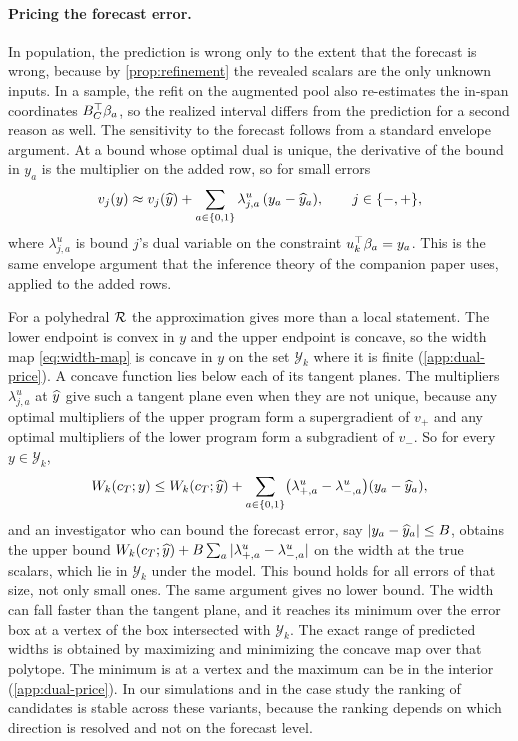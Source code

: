 \paragraph{Pricing the forecast error.}
In population, the prediction is wrong only to the extent that the
forecast is wrong, because by \cref{prop:refinement} the revealed
scalars are the only unknown inputs. In a sample, the refit on the
augmented pool also re-estimates the in-span coordinates
$B_C^\top\beta_a$, so the realized interval differs from the
prediction for a second reason as well. The sensitivity to the forecast
follows from a standard envelope argument. At a bound whose optimal dual
is unique, the derivative of the bound in $y_a$ is the multiplier on the
added row, so for small errors
\begin{equation}
  v_j(y)\approx v_j(\widehat{y})
  +\sum_{a\in\{0,1\}}\lambda^{u}_{j,a}\,(y_a-\widehat{y}_a),
  \qquad j\in\{-,+\},
  \label{eq:dual-pricing}
\end{equation}
where $\lambda^{u}_{j,a}$ is bound $j$'s dual variable on the constraint
$u_{k}^\top\beta_a=y_a$. This is the same envelope argument that
the inference theory of the companion paper uses, applied to the added
rows.

For a polyhedral $\mathcal R$ the approximation gives more than a local
statement. The lower endpoint is convex in $y$ and the upper endpoint is
concave, so the width map \eqref{eq:width-map} is concave in $y$ on the
set $\mathcal Y_k$ where it is finite (\cref{app:dual-price}). A concave
function lies below each of its tangent planes. The multipliers
$\lambda^{u}_{j,a}$ at $\widehat{y}$ give such a tangent plane even when
they are not unique, because any optimal multipliers of the upper
program form a supergradient of $v_+$ and any optimal multipliers of the
lower program form a subgradient of $v_-$. So for every
$y\in\mathcal Y_k$,
\begin{equation}
  W_k(c_T;y)\leq W_k(c_T;\widehat{y})
  +\sum_{a\in\{0,1\}}\bigl(\lambda^{u}_{+,a}-\lambda^{u}_{-,a}\bigr)
  (y_a-\widehat{y}_a),
  \label{eq:width-upper}
\end{equation}
and an investigator who can bound the forecast error, say
$|y_a-\widehat{y}_a|\leq B$, obtains the upper bound
$W_k(c_T;\widehat{y})+B\sum_a|\lambda^{u}_{+,a}-\lambda^{u}_{-,a}|$ on
the width at the true scalars, which lie in $\mathcal Y_k$ under the
model. This bound holds for all errors of that size, not only small
ones. The same argument gives no lower bound. The width can
fall faster than the tangent plane, and it reaches its minimum over the
error box at a vertex of the box intersected with $\mathcal Y_k$. The
exact range of predicted widths is obtained by maximizing and minimizing
the concave map over that polytope. The minimum is at a vertex and the
maximum can be in the interior (\cref{app:dual-price}). In our
simulations and in the case study the ranking of candidates is stable
across these variants, because the ranking depends on which direction is
resolved and not on the forecast level.

